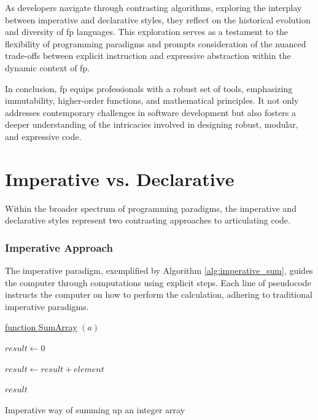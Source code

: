     As developers navigate through contrasting algorithms, exploring the interplay between imperative and declarative styles, they reflect on the historical evolution and diversity of \ac{fp} languages. This exploration serves as a testament to the flexibility of programming paradigms and prompts consideration of the nuanced trade-offs between explicit instruction and expressive abstraction within the dynamic context of \ac{fp}.
    
    In conclusion, \ac{fp} equips professionals with a robust set of tools, emphasizing immutability, higher-order functions, and mathematical principles. It not only addresses contemporary challenges in software development but also fosters a deeper understanding of the intricacies involved in designing robust, modular, and expressive code.
    

\section{Imperative vs. Declarative}

Within the broader spectrum of programming paradigms, the imperative and declarative styles represent two contrasting approaches to articulating code.

\subsubsection{Imperative Approach}

The imperative paradigm, exemplified by Algorithm \ref{alg:imperative_sum}, guides the computer through computations using explicit steps. Each line of pseudocode instructs the computer on how to perform the calculation, adhering to traditional imperative paradigms.

\begin{algorithm}

    \underline{function SumArray} $(a)$\;
    
    \BlankLine
    $result \leftarrow 0$
    
    {
        $result \leftarrow result + element$
    }
    
    \Return $result$
    
    \caption{Imperative way of summing up an integer array}
    \label{alg:imperative_sum}
\end{algorithm}

